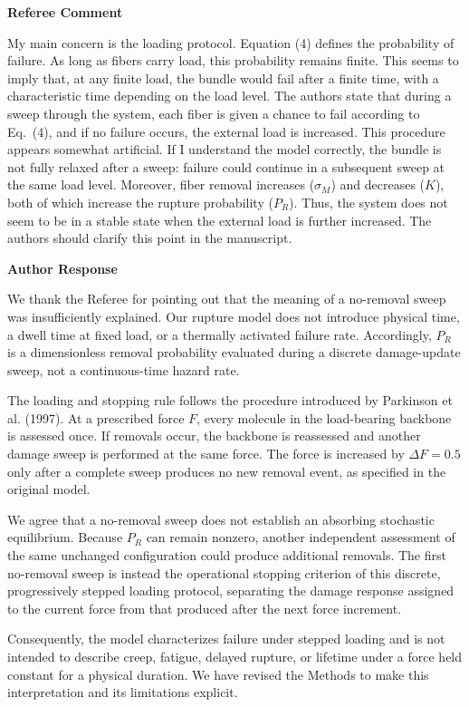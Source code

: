 \documentclass[11pt]{article}
\newenvironment{refereecomment}
  {%
    \par
    \begingroup
    \color{commentgray}
    \itshape
    \setlength{\leftskip}{1.4em}
    \setlength{\rightskip}{1.4em}
  }
  {%
    \par
    \endgroup
  }
\newcommand{\refereelabel}{%
  \par\smallskip
  {\color{commentgray}\bfseries Referee Comment}\par
}
\newcommand{\responselabel}{%
  \par\medskip
  {\color{responseblue}\bfseries Author Response}\par
}
\begin{document}
\refereelabel
\begin{refereecomment}
My main concern is the loading protocol. Equation (4) defines the probability
of failure. As long as fibers carry load, this probability remains finite.
This seems to imply that, at any finite load, the bundle would fail after a
finite time, with a characteristic time depending on the load level. The
authors state that during a sweep through the system, each fiber is given a
chance to fail according to Eq.~(4), and if no failure occurs, the external
load is increased. This procedure appears somewhat artificial. If I understand
the model correctly, the bundle is not fully relaxed after a sweep: failure
could continue in a subsequent sweep at the same load level. Moreover, fiber
removal increases (\(\sigma_M\)) and decreases (\(K\)), both of which increase
the rupture probability (\(P_R\)). Thus, the system does not seem to be in a
stable state when the external load is further increased. The authors should
clarify this point in the manuscript.
\end{refereecomment}

\responselabel
We thank the Referee for pointing out that the meaning of a no-removal sweep
was insufficiently explained. Our rupture model does not introduce physical
time, a dwell time at fixed load, or a thermally activated failure rate.
Accordingly, \(P_R\) is a dimensionless removal probability evaluated during
a discrete damage-update sweep, not a continuous-time hazard rate.

The loading and stopping rule follows the procedure introduced by Parkinson et
al. (1997). At a prescribed force \(F\), every molecule in the load-bearing
backbone is assessed once. If removals occur, the backbone is reassessed and
another damage sweep is performed at the same force. The force is increased by
\(\Delta F=0.5\) only after a complete sweep produces no new removal event, as
specified in the original model.

We agree that a no-removal sweep does not establish an absorbing stochastic
equilibrium. Because \(P_R\) can remain nonzero, another independent assessment
of the same unchanged configuration could produce additional removals. The
first no-removal sweep is instead the operational stopping criterion of this
discrete, progressively stepped loading protocol, separating the damage
response assigned to the current force from that produced after the next force
increment.

Consequently, the model characterizes failure under stepped loading and is not
intended to describe creep, fatigue, delayed rupture, or lifetime under a force
held constant for a physical duration. We have revised the Methods to make this
interpretation and its limitations explicit.
\end{document}
